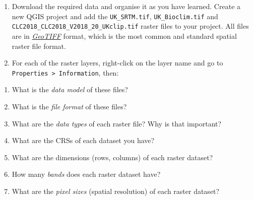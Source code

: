 \documentclass[
  letterpaper,
  DIV=11,
  numbers=noendperiod]{scrreprt}
\begin{document}
\begin{enumerate}
\def\labelenumi{(\arabic{enumi})}
\setcounter{enumi}{122}
\item
  Download the required data and organise it as you have learned. Create
  a new QGIS project and add the \texttt{UK\_SRTM.tif},
  \texttt{UK\_Bioclim.tif} and
  \texttt{CLC2018\_CLC2018\_V2018\_20\_UKclip.tif} raster files to your
  project. All files are in
  \href{https://en.wikipedia.org/wiki/GeoTIFF}{\emph{GeoTIFF}} format,
  which is the most common and standard spatial raster file format.
\item
  For each of the raster layers, right-click on the layer name and go to
  \texttt{Properties\ \textgreater{}\ Information}, then:
\end{enumerate}

\begin{tcolorbox}[enhanced jigsaw, breakable, toptitle=1mm, colback=white, left=2mm, leftrule=.75mm, titlerule=0mm, colframe=quarto-callout-important-color-frame, opacityback=0, title=\textcolor{quarto-callout-important-color}{\faExclamation}\hspace{0.5em}{Stop and Think}, toprule=.15mm, opacitybacktitle=0.6, bottomtitle=1mm, colbacktitle=quarto-callout-important-color!10!white, bottomrule=.15mm, coltitle=black, rightrule=.15mm, arc=.35mm]

\begin{enumerate}
\def\labelenumi{\alph{enumi})}
\item
  What is the \emph{data model} of these files?
\item
  What is the \emph{file format} of these files?
\item
  What are the \emph{data types} of each raster file? Why is that
  important?
\item
  What are the CRSs of each dataset you have?
\item
  What are the dimensions (rows, columns) of each raster dataset?
\item
  How many \emph{bands} does each raster dataset have?
\item
  What are the \emph{pixel sizes} (spatial resolution) of each raster
  dataset?
\end{enumerate}

\end{tcolorbox}
\end{document}
